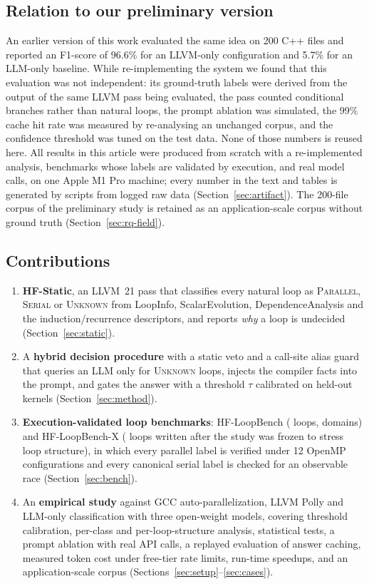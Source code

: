 \subsection{Relation to our preliminary version}
An earlier version of this work evaluated the same idea on 200 C++ files and reported an F1-score of 96.6\% for an LLVM-only configuration and 5.7\% for an LLM-only baseline. While re-implementing the system we found that this evaluation was not independent: its ground-truth labels were derived from the output of the same LLVM pass being evaluated, the pass counted conditional branches rather than natural loops, the prompt ablation was simulated, the 99\% cache hit rate was measured by re-analysing an unchanged corpus, and the confidence threshold was tuned on the test data. None of those numbers is reused here. All results in this article were produced from scratch with a re-implemented analysis, benchmarks whose labels are validated by execution, and real model calls, on one Apple M1 Pro machine; every number in the text and tables is generated by scripts from logged raw data (Section~\ref{sec:artifact}). The 200-file corpus of the preliminary study is retained as an application-scale corpus without ground truth (Section~\ref{sec:rq-field}).

\subsection{Contributions}
\begin{enumerate}
    \item \textbf{HF-Static}, an LLVM~21 pass that classifies every natural loop as \textsc{Parallel}, \textsc{Serial} or \textsc{Unknown} from LoopInfo, ScalarEvolution, DependenceAnalysis and the induction/recurrence descriptors, and reports \emph{why} a loop is undecided (Section~\ref{sec:static}).
    \item A \textbf{hybrid decision procedure} with a static veto and a call-site alias guard that queries an LLM only for \textsc{Unknown} loops, injects the compiler facts into the prompt, and gates the answer with a threshold $\tau$ calibrated on held-out kernels (Section~\ref{sec:method}).
    \item \textbf{Execution-validated loop benchmarks}: HF-LoopBench (\nBenchLoops{} loops, \nBenchDomains{} domains) and HF-LoopBench-X (\xLoops{} loops written after the study was frozen to stress loop structure), in which every parallel label is verified under 12 OpenMP configurations and every canonical serial label is checked for an observable race (Section~\ref{sec:bench}).
    \item An \textbf{empirical study} against GCC auto-parallelization, LLVM Polly and LLM-only classification with three open-weight models, covering threshold calibration, per-class and per-loop-structure analysis, statistical tests, a prompt ablation with real API calls, a replayed evaluation of answer caching, measured token cost under free-tier rate limits, run-time speedups, and an application-scale corpus (Sections~\ref{sec:setup}--\ref{sec:cases}).
\end{enumerate}

